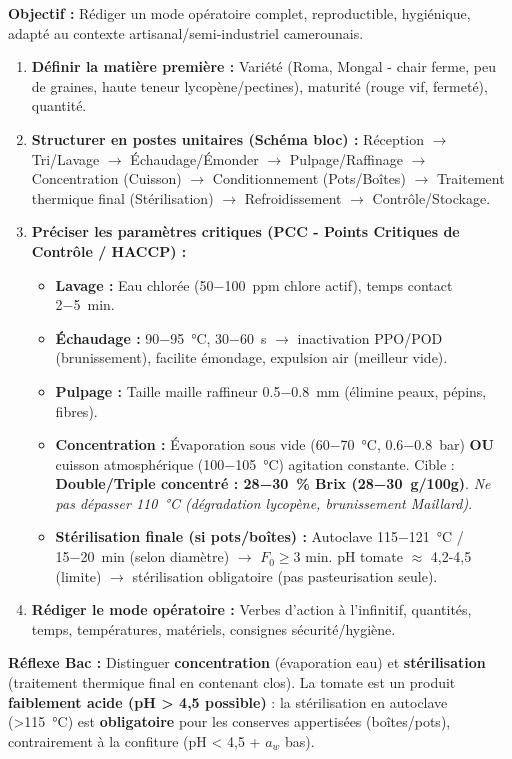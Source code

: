 \documentclass[11pt]{article}
\begin{document}
\begin{methode}
    \textbf{Objectif :} Rédiger un mode opératoire complet, reproductible, hygiénique, adapté au contexte artisanal/semi-industriel camerounais.
    \begin{enumerate}
        \item \textbf{Définir la matière première :} Variété (Roma, Mongal - chair ferme, peu de graines, haute teneur lycopène/pectines), maturité (rouge vif, fermeté), quantité.
        \item \textbf{Structurer en postes unitaires (Schéma bloc) :} Réception $\rightarrow$ Tri/Lavage $\rightarrow$ Échaudage/Émonder $\rightarrow$ Pulpage/Raffinage $\rightarrow$ Concentration (Cuisson) $\rightarrow$ Conditionnement (Pots/Boîtes) $\rightarrow$ Traitement thermique final (Stérilisation) $\rightarrow$ Refroidissement $\rightarrow$ Contrôle/Stockage.
        \item \textbf{Préciser les paramètres critiques (PCC - Points Critiques de Contrôle / HACCP) :}
            \begin{itemize}
                \item \textbf{Lavage :} Eau chlorée (\SI{50-100}{ppm} chlore actif), temps contact \SI{2-5}{min}.
                \item \textbf{Échaudage :} \SI{90-95}{\celsius}, \SI{30-60}{s} $\rightarrow$ inactivation PPO/POD (brunissement), facilite émondage, expulsion air (meilleur vide).
                \item \textbf{Pulpage :} Taille maille raffineur \SI{0,5-0,8}{mm} (élimine peaux, pépins, fibres).
                \item \textbf{Concentration :} Évaporation sous vide (\SI{60-70}{\celsius}, \SI{0,6-0,8}{bar}) \textbf{OU} cuisson atmosphérique (\SI{100-105}{\celsius}) agitation constante. Cible : \textbf{Double/Triple concentré : \SI{28-30}{\%} Brix (\SI{28-30}{g/100g})}. \emph{Ne pas dépasser \SI{110}{\celsius} (dégradation lycopène, brunissement Maillard)}.
                \item \textbf{Stérilisation finale (si pots/boîtes) :} Autoclave \SI{115-121}{\celsius} / \SI{15-20}{min} (selon diamètre) $\rightarrow$ $F_0 \ge 3$ min. pH tomate $\approx$ 4,2-4,5 (limite) $\rightarrow$ stérilisation obligatoire (pas pasteurisation seule).
            \end{itemize}
        \item \textbf{Rédiger le mode opératoire :} Verbes d'action à l'infinitif, quantités, temps, températures, matériels, consignes sécurité/hygiène.
    \end{enumerate}
    \textbf{Réflexe Bac :} Distinguer \textbf{concentration} (évaporation eau) et \textbf{stérilisation} (traitement thermique final en contenant clos). La tomate est un produit \textbf{faiblement acide (pH > 4,5 possible)} : la stérilisation en autoclave (\SI{>115}{\celsius}) est \textbf{obligatoire} pour les conserves appertisées (boîtes/pots), contrairement à la confiture (pH < 4,5 + $a_w$ bas).
\end{methode}
\end{document}
